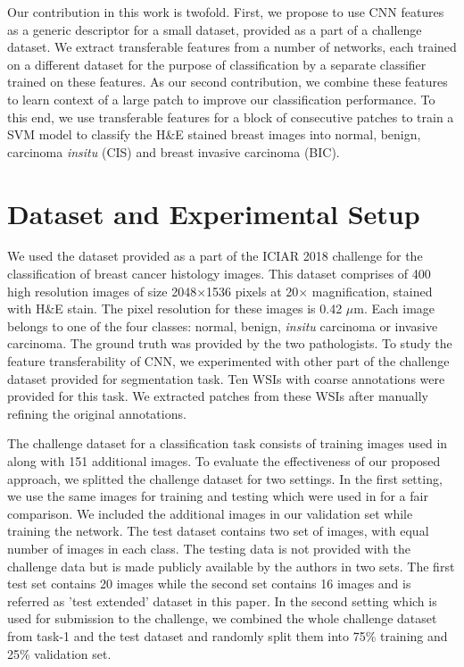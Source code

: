 \documentclass[runningheads,a4paper]{llncs}
\begin{document}

Our contribution in this work is twofold. First, we propose to use CNN features as a generic descriptor for a small dataset, provided as a part of a challenge dataset. We extract transferable features from a number of networks, each trained on a different dataset for the purpose of classification by a separate classifier trained on these features. As our second contribution, we combine these features to learn context of a large patch to improve our classification performance. To this end, we use transferable features for a block of consecutive patches to train a SVM model to classify the H\&E stained breast images into normal, benign, carcinoma \emph{insitu} (CIS) and breast invasive carcinoma (BIC). 


\section{Dataset and Experimental Setup}

We used the dataset provided as a part of the ICIAR 2018 challenge for the classification of breast cancer histology images. This dataset comprises of 400 high resolution images of size 2048$\times$1536 pixels at 20$\times$ magnification, stained with H\&E stain. The pixel resolution for these images is 0.42 $\mu$m. Each image belongs to one of the four classes: normal, benign, \emph{insitu} carcinoma or invasive carcinoma. The ground truth was provided by the two pathologists. To study the feature transferability of CNN, we experimented with other part of the challenge dataset provided for segmentation task. Ten WSIs with coarse annotations were provided for this task. We extracted patches from these WSIs after manually refining the original annotations.

The challenge dataset for a classification task consists of training images used in \cite{araujo2017classification} along with 151 additional images. To evaluate the effectiveness of our proposed approach, we splitted the challenge dataset for two settings. In the first setting, we use the same images for training and testing which were used in \cite{araujo2017classification} for a fair comparison. We included the additional images in our validation set while training the network. The test dataset contains two set of images, with equal number of images in each class. The testing data is not provided with the challenge data but is made publicly available by the authors in two sets. The first test set contains 20 images while the second set contains 16 images and is referred as ’test extended’ dataset in this paper. In the second setting which is used for submission to the challenge, we combined the whole challenge dataset from task-1 and the test dataset and randomly split them into 75\% training and 25\% validation set.
\end{document}

